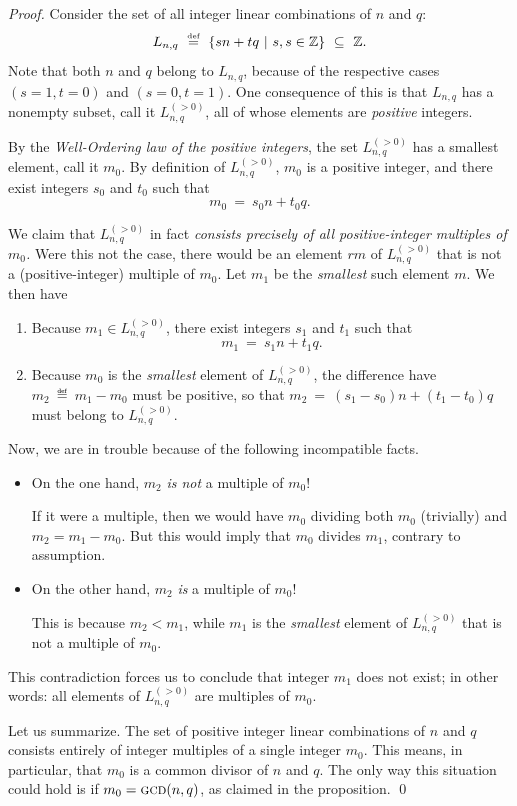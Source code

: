 \begin{proof}
Consider the set of all integer linear combinations of $n$ and $q$:
\[  L_{n,q} \ \stackrel{\mbox{{\tiny def}}}{=} \   \{ sn +tq \ | \ s, s \in \mathbb{Z} \} \ \subseteq \ \mathbb{Z}. \]
Note that both $n$ and $q$ belong to $L_{n,q}$, because of the
respective cases $(s=1, t=0)$ and $(s=0, t=1)$.  One consequence of
this is that $L_{n,q}$ has a nonempty subset, call it
$L^{(>0)}_{n,q}$, all of whose elements are {\em positive} integers.

By the {\it Well-Ordering law of the positive integers}, the set
$L^{(>0)}_{n,q}$ has a smallest element, call it $m_0$.  By definition
of $L^{(>0)}_{n,q}$, $m_0$ is a positive integer, and there exist
integers $s_0$ and $t_0$ such that
\[  m_0 \ = \ s_0 n + t_0 q. \]

We claim that $L^{(>0)}_{n,q}$ in fact {\em consists precisely of all
  positive-integer multiples of $m_0$.}  Were this not the case, there
would be an element $rm$ of $L^{(>0)}_{n,q}$ that is not a
(positive-integer) multiple of $m_0$.  Let $m_1$ be the {\em smallest}
such element $m$.  We then have
\begin{enumerate}
\item
Because $m_1 \in L^{(>0)}_{n,q}$, there exist integers $s_1$ and $t_1$
such that
\[  m_1 \ = \ s_1 n + t_1 q. \]
\item
Because $m_0$ is the {\em smallest} element of $L^{(>0)}_{n,q}$, the
difference have $m_2 \ \eqdef \ m_1 - m_0$ must be positive, so that
$m_2 \ = \ (s_1 - s_0) n + (t_1 -t_0) q$ must belong to
$L^{(>0)}_{n,q}$.
\end{enumerate}
Now, we are in trouble because of the following incompatible facts.
\begin{itemize}
\item
On the one hand, $m_2$ {\em is not} a multiple of $m_0$!

If it were a multiple, then we would have $m_0$ dividing both $m_0$
(trivially) and $m_2 = m_1 - m_0$.  But this would imply that $m_0$
divides $m_1$, contrary to assumption.

\item
On the other hand,
$m_2$ {\em is} a multiple of $m_0$!

This is because $m_2 < m_1$, while $m_1$ is the {\em smallest} element
of $L^{(>0)}_{n,q}$ that is not a multiple of $m_0$.
\end{itemize}
This contradiction forces us to conclude that integer $m_1$ does not
exist; in other words: all elements of $L^{(>0)}_{n,q}$ are multiples
of $m_0$.

Let us summarize.  The set of positive integer linear combinations of
$n$ and $q$ consists entirely of integer multiples of a single integer
$m_0$.  This means, in particular, that $m_0$ is a common divisor
of $n$ and $q$.  The only way this situation could hold is if
$m_0 = \mbox{\sc gcd}(n,q)$, as claimed in the proposition.  \qed
\end{proof}

